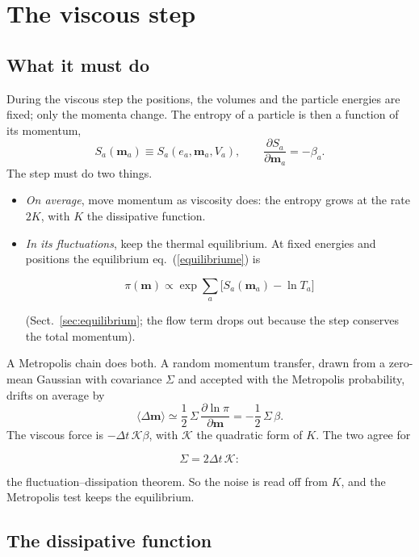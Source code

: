 \documentclass[11pt,aps,preprint,nofootinbib,superscriptaddress,tightenlines]{revtex4-2}
\newcommand{\avg}[1]{\langle #1\rangle}
\def\st{\begin{equation}}
\def\stp{\end{equation}}
\def\Eq#1{eq.~(\ref{#1})}
\def\Sect#1{Sect.~\ref{#1}}
\begin{document}
\section{The viscous step}
\label{sec:viscous}

\subsection{What it must do}

During the viscous step the positions, the volumes and the particle energies are fixed; only the momenta change.  The entropy of a particle
is then a function of its momentum,
\st
S_a(\bm m_a)\equiv S_a(e_a,\bm m_a,V_a),\qquad \frac{\partial S_a}{\partial\bm m_a}=-\beta_a .
\stp
The step must do two things.
\begin{itemize}
\item \emph{On average}, move momentum as viscosity does: the entropy grows at the rate $2K$, with $K$ the dissipative function.
\item \emph{In its fluctuations}, keep the thermal equilibrium.  At fixed energies and positions the equilibrium \Eq{equilibriume} is
\begin{keyeq}
  \st
  \pi(\bm m)\propto\exp\sum_a\big[S_a(\bm m_a)-\ln T_a\big]
  \label{target}
  \stp
\end{keyeq}
  (\Sect{sec:equilibrium}; the flow term drops out because the step conserves the total momentum).
\end{itemize}
A Metropolis chain does both.  A random momentum transfer, drawn from a zero-mean Gaussian with covariance $\Sigma$ and accepted with the
Metropolis probability, drifts on average by
\st
\avg{\Delta\bm m}\simeq\frac12\,\Sigma\,\frac{\partial\ln\pi}{\partial\bm m}=-\frac12\,\Sigma\,\beta .
\stp
The viscous force is $-\Delta t\,\mathcal K\beta$, with $\mathcal K$ the quadratic form of $K$.  The two agree for
\begin{keyeq}
\st
\Sigma=2\Delta t\,\mathcal K :
\stp
\end{keyeq}
the fluctuation--dissipation theorem.  So the noise is read off from $K$, and the Metropolis test keeps the equilibrium.

\subsection{The dissipative function}
\end{document}
